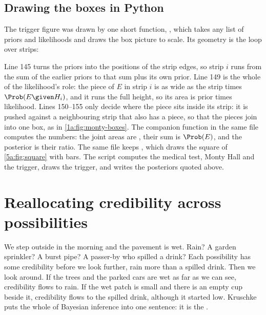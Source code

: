 \subsection{Drawing the boxes in Python}

The trigger figure was drawn by one short function, , which
takes any list of priors and likelihoods and draws the box picture to scale. Its
geometry is the loop over strips:

\label{5a:lst:area}

Line 145 turns the priors into the positions of the strip edges, so strip $i$ runs
from the sum of the earlier priors to that sum plus its own prior. Line 149 is the
whole of the likelihood's role: the piece of $E$ in strip $i$ is as wide as the strip
times $\Prob(E\given H_i)$, and it runs the full height, so its area is prior times
likelihood. Lines 150--155 only decide where the piece sits inside its strip: it is
pushed against a neighbouring strip that also has a piece, so that the pieces join
into one box, as in \cref{1a:fig:monty-boxes}. The companion function
 in the same file computes the numbers: the joint areas are
, their sum is $\Prob(E)$, and the posterior is their ratio.
The same file keeps , which draws the square of
\cref{5a:fig:square} with bars. The script 
computes the medical test, Monty Hall and the trigger, draws the trigger, and writes
the posteriors quoted above.
\section{Reallocating credibility across possibilities}
\label{5a:sec:reallocation}

We step outside in the morning and the pavement is wet. Rain? A garden sprinkler?
A burst pipe? A passer-by who spilled a drink? Each possibility has some
credibility before we look further, rain more than a spilled drink. Then we look
around. If the trees and the parked cars are wet as far as we can see, credibility
flows to rain. If the wet patch is small and there is an empty cup beside it,
credibility flows to the spilled drink, although it started low. Kruschke puts the
whole of Bayesian inference into one sentence: it is the  .

